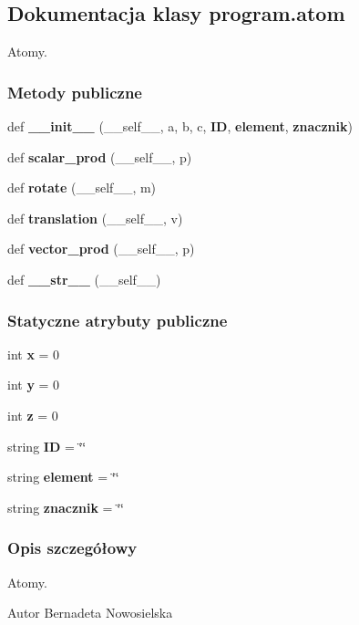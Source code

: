 \subsection{Dokumentacja klasy program.\+atom}
\label{classprogram_1_1atom}


Atomy.  


\subsubsection*{Metody publiczne}
\begin{DoxyCompactItemize}
\item 
def \textbf{ \+\_\+\+\_\+init\+\_\+\+\_\+} (\+\_\+\+\_\+self\+\_\+\+\_\+, a, b, c, \textbf{ ID}, \textbf{ element}, \textbf{ znacznik})
\item 
def \textbf{ scalar\+\_\+prod} (\+\_\+\+\_\+self\+\_\+\+\_\+, p)
\item 
def \textbf{ rotate} (\+\_\+\+\_\+self\+\_\+\+\_\+, m)
\item 
def \textbf{ translation} (\+\_\+\+\_\+self\+\_\+\+\_\+, v)
\item 
def \textbf{ vector\+\_\+prod} (\+\_\+\+\_\+self\+\_\+\+\_\+, p)
\item 
def \textbf{ \+\_\+\+\_\+str\+\_\+\+\_\+} (\+\_\+\+\_\+self\+\_\+\+\_\+)
\end{DoxyCompactItemize}
\subsubsection*{Statyczne atrybuty publiczne}
\begin{DoxyCompactItemize}
\item 
int \textbf{ x} = 0
\item 
int \textbf{ y} = 0
\item 
int \textbf{ z} = 0
\item 
string \textbf{ ID} = \char`\"{}\char`\"{}
\item 
string \textbf{ element} = \char`\"{}\char`\"{}
\item 
string \textbf{ znacznik} = \char`\"{}\char`\"{}
\end{DoxyCompactItemize}


\subsubsection{Opis szczegółowy}
Atomy. 

\begin{DoxyAuthor}{Autor}
Bernadeta Nowosielska 
\end{DoxyAuthor}

